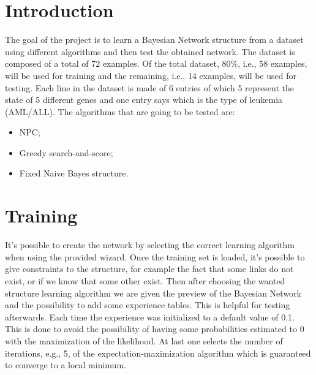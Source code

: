\section*{Introduction}
The goal of the project is to learn a Bayesian Network structure from a dataset  using different algorithms and then test the obtained network. \newline 
The dataset is composed of a total of 72 examples. Of the total dataset, $80\%$, i.e., 58 examples, will be used for training and the remaining, i.e., 14 examples, will be used for testing.\newline
Each line in the dataset is made of 6 entries of which 5 represent the state of 5 different genes and one entry says which is the type of leukemia (AML/ALL). \newline
The algorithms that are going to be tested are:
\begin{itemize}
	\item NPC;
	\item Greedy search-and-score;
	\item Fixed Naive Bayes structure.
\end{itemize}
%
%
%
\section*{Training}
It's possible to create the network by selecting the correct learning algorithm when using the provided wizard. \newline
Once the training set is loaded, it's possible to give constraints to the structure, for example the fact that some links do not exist, or if we know that some other exist. \newline  
Then after choosing the wanted structure learning algorithm we are given the preview of the Bayesian Network and the possibility to add some experience tables. This is helpful for testing afterwards. Each time the experience was initialized to a default value of 0.1. This is done to avoid the possibility of having some probabilities estimated to 0 with the maximization of the likelihood. \newline
At last one selects the number of iterations, e.g., 5, of the expectation-maximization algorithm which is guaranteed to converge to a local minimum. 
%
%
%

